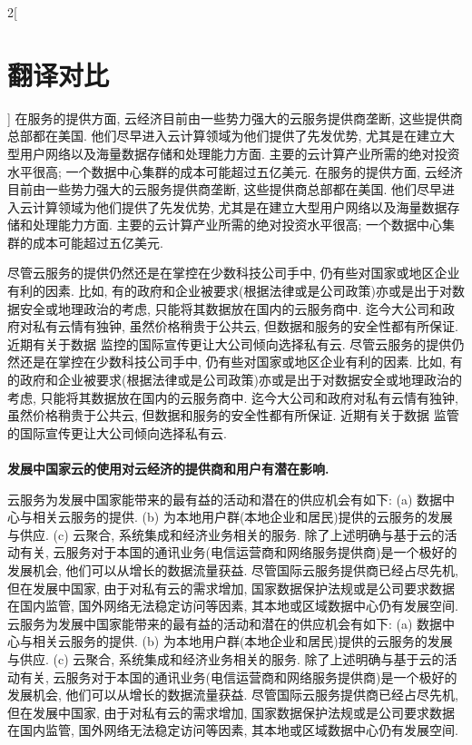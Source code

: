 \documentclass[a4paper, UTF8, 12pt]{article}
\begin{document}
\begin{paracol}{2}[\section{翻译对比}]
    \switchcolumn*
    在服务的提供方面, 云经济目前由一些势力强大的云服务提供商垄断, 这些提供商总部都在美国. 他们尽早进入云计算领域为他们提供了先发优势, 尤其是在建立大型用户网络以及海量数据存储和处理能力方面. 主要的云计算产业所需的绝对投资水平很高; 一个数据中心集群的成本可能超过五亿美元.
    \switchcolumn
    在服务的提供方面, 云经济目前由一些势力强大的云服务提供商垄断, 这些提供商总部都在美国. 他们尽早进入云计算领域为他们提供了先发优势, 尤其是在建立大型用户网络以及海量数据存储和处理能力方面. 主要的云计算产业所需的绝对投资水平很高; 一个数据中心集群的成本可能超过五亿美元.

    \switchcolumn*
    尽管云服务的提供仍然还是在掌控在少数科技公司手中, 仍有些对国家或地区企业有利的因素. 比如, 有的政府和企业被要求(根据法律或是公司政策)亦或是出于对数据安全或地理政治的考虑, 只能将其数据放在国内的云服务商中. 迄今大公司和政府对私有云情有独钟, {\color{blue} 虽然价格稍贵于公共云}, 但数据和服务的安全性都有所保证. 近期有关于数据{\color{red} 监控}的国际宣传更让大公司倾向选择私有云.
    \switchcolumn
    尽管云服务的提供仍然还是在掌控在少数科技公司手中, 仍有些对国家或地区企业有利的因素. 比如, 有的政府和企业被要求(根据法律或是公司政策)亦或是出于对数据安全或地理政治的考虑, 只能将其数据放在国内的云服务商中. 迄今大公司和政府对私有云情有独钟, {\color{blue} 虽然价格稍贵于公共云}, 但数据和服务的安全性都有所保证. 近期有关于数据{\color{red} 监管}的国际宣传更让大公司倾向选择私有云.
    
    \switchcolumn*
    \paragraph{} 
    \switchcolumn
    \paragraph{}
    {\bfseries 发展中国家云的使用对云经济的提供商和用户有潜在影响.} 
    
    \switchcolumn*
    云服务为发展中国家能带来的最有益的活动和潜在的供应机会有如下: (a) 数据中心与相关云服务的提供. (b) 为本地用户群(本地企业和居民)提供的云服务的发展与供应. (c) 云聚合, 系统集成和经济业务相关的服务. 除了上述明确与基于云的活动有关, 云服务对于本国的通讯业务(电信运营商和网络服务提供商)是一个极好的发展机会, 他们可以从增长的数据流量获益. {\color{blue} 尽管国际云服务提供商已经占尽先机, 但在发展中国家, 由于对私有云的需求增加, 国家数据保护法规或是公司要求数据在国内监管, 国外网络无法稳定访问等因素, 其本地或区域数据中心仍有发展空间.}
    \switchcolumn
    云服务为发展中国家能带来的最有益的活动和潜在的供应机会有如下: (a) 数据中心与相关云服务的提供. (b) 为本地用户群(本地企业和居民)提供的云服务的发展与供应. (c) 云聚合, 系统集成和经济业务相关的服务. 除了上述明确与基于云的活动有关, 云服务对于本国的通讯业务(电信运营商和网络服务提供商)是一个极好的发展机会, 他们可以从增长的数据流量获益. {\color{blue} 尽管国际云服务提供商已经占尽先机, 但在发展中国家, 由于对私有云的需求增加, 国家数据保护法规或是公司要求数据在国内监管, 国外网络无法稳定访问等因素, 其本地或区域数据中心仍有发展空间.}


\end{paracol}
\end{document}
